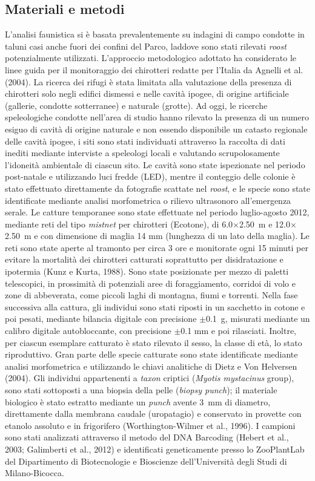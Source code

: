 \begin{multicols}{2}
\section*{Materiali e metodi}
L’analisi faunistica si è basata prevalentemente su indagini di campo condotte in taluni casi anche fuori dei confini del Parco, laddove sono stati rilevati \textit{roost} potenzialmente utilizzati. L’approccio metodologico adottato ha considerato le linee guida per il monitoraggio dei chirotteri redatte per l’Italia da Agnelli et al. (2004). La ricerca dei rifugi è stata limitata alla valutazione della presenza di chirotteri solo negli edifici dismessi e nelle cavità ipogee, di origine artificiale (gallerie, condotte sotterranee) e naturale (grotte). Ad oggi, le ricerche speleologiche condotte nell’area di studio hanno rilevato la presenza di un numero esiguo di cavità di origine naturale e non essendo disponibile un catasto regionale delle cavità ipogee, i siti sono stati individuati attraverso la raccolta di dati inediti mediante interviste a speleologi locali e valutando scrupolosamente l’idoneità ambientale di ciascun sito. Le cavità sono state ispezionate nel periodo post-natale e utilizzando luci fredde (LED), mentre il conteggio delle colonie è stato effettuato direttamente da fotografie scattate nel \textit{roost}, e le specie sono state identificate mediante analisi morfometrica o rilievo ultrasonoro all’emergenza serale. Le catture temporanee sono state effettuate nel periodo luglio-agosto 2012, mediante reti del tipo \textit{mistnet} per chirotteri (Ecotone), di 6.0$\times$2.50~m e 12.0$\times$2.50~m e con dimensione di maglia 14 mm (lunghezza di un lato della maglia). Le reti sono state aperte al tramonto per circa 3 ore e monitorate ogni 15 minuti per evitare la mortalità dei chirotteri catturati soprattutto per disidratazione e ipotermia (Kunz e Kurta, 1988). Sono state posizionate per mezzo di paletti telescopici, in prossimità di potenziali aree di foraggiamento, corridoi di volo e zone di abbeverata, come piccoli laghi di montagna, fiumi e torrenti. Nella fase successiva alla cattura, gli individui sono stati riposti in un sacchetto in cotone e poi pesati, mediante bilancia digitale con precisione $\pm$0.1~g, misurati mediante un calibro digitale autobloccante, con precisione $\pm$0.1 mm e poi rilasciati. Inoltre, per ciascun esemplare catturato è stato rilevato il sesso, la classe di età, lo stato riproduttivo. Gran parte delle specie catturate sono state identificate mediante analisi morfometrica e utilizzando le chiavi analitiche di Dietz e Von Helversen (2004). Gli individui appartenenti a \textit{taxon} criptici (\emph{Myotis mystacinus} group), sono stati sottoposti a una biopsia della pelle (\textit{biopsy punch}); il materiale biologico è stato estratto mediante un \textit{punch} avente 3~mm di diametro, direttamente dalla membrana caudale (uropatagio) e conservato in provette con etanolo assoluto e in frigorifero (Worthington-Wilmer et al., 1996). I campioni sono stati analizzati attraverso il metodo del DNA Barcoding (Hebert et al., 2003; Galimberti et al., 2012) e identificati geneticamente presso lo ZooPlantLab del Dipartimento di Biotecnologie e Bioscienze dell’Università degli Studi di Milano-Bicocca.


\end{multicols}
